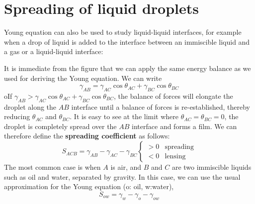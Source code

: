 \documentclass[a4paper, 11pt, normalem]{report}
\begin{document}
\section{Spreading of liquid droplets}
Young equation can also be used to study liquid-liquid interfaces, for example when a drop of liquid is added to the interface between an immiscible liquid and a gas or a liquid-liquid interface:
\begin{figure}[H]
    \centering
\end{figure}
It is immediate from the figure that we can apply the same energy balance as we used for deriving the Young equation.
We can write
\begin{equation}
    \gamma_{AB} = \gamma_{AC}\cos\theta_{AC} + \gamma_{BC}\cos\theta_{BC}
\end{equation}oIf $\gamma_{AB} > \gamma_{AC}\cos\theta_{AC} + \gamma_{BC}\cos\theta_{BC}$, the balance of forces will elongate the droplet along the $AB$ interface until a balance of forces is re-established, thereby reducing $\theta_{AC}$ and $\theta_{BC}$.
It is easy to see at the limit where $\theta_{AC} = \theta_{BC} = 0$, the droplet is completely spread over the $AB$ interface and forms a film.
We can therefore define the \textbf{spreading coefficient} as follows:
\begin{equation}
    S_{ACB} = \gamma_{AB} - \gamma_{AC} - \gamma_{BC} \begin{cases} > 0 & \text{spreading} \\ < 0 & \text{lensing} \end{cases}
\end{equation}
The most common case is when $A$ is air, and $B$ and $C$ are two immiscible liquids such as oil and water, separated by gravity.
In this case, we can use the usual approximation for the Young equation (o: oil, w:water),
\begin{equation}
    S_{ow} = \gamma_w - \gamma_o - \gamma_{ow}
\end{equation}
\end{document}
